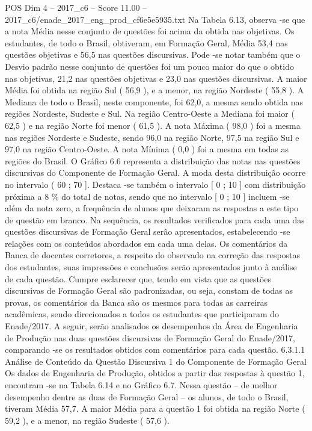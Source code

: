 \begin{textsample}{POS Dim 4 – 2017\_c6 – Score 11.00 – 2017\_c6/enade\_2017\_eng\_prod\_cf6e5e5935.txt}
Na Tabela 6.13, observa -se que a nota Média nesse conjunto de questões foi acima da obtida nas objetivas.
Os estudantes, de todo o Brasil, obtiveram, em Formação Geral, Média 53,4 nas questões objetivas e 56,5 nas questões discursivas.
Pode -se notar também que o Desvio padrão nesse conjunto de questões foi um pouco maior do que o obtido nas objetivas, 21,2 nas questões objetivas e 23,0 nas questões discursivas.
A maior Média foi obtida na região Sul ( 56,9 ), e a menor, na região Nordeste ( 55,8 ).
A Mediana de todo o Brasil, neste componente, foi 62,0, a mesma sendo obtida nas regiões Nordeste, Sudeste e Sul.
Na região Centro-Oeste a Mediana foi maior ( 62,5 ) e na região Norte foi menor ( 61,5 ).
A nota Máxima ( 98,0 ) foi a mesma nas regiões Nordeste e Sudeste, sendo 96,0 na região Norte, 97,5 na região Sul e 97,0 na região Centro-Oeste.
A nota Mínima ( 0,0 ) foi a mesma em todas as regiões do Brasil.
O Gráfico 6.6 representa a distribuição das notas nas questões discursivas do Componente de Formação Geral.
A moda desta distribuição ocorre no intervalo ( 60 ; 70 ].
Destaca -se também o intervalo [ 0 ; 10 ] com distribuição próxima a 8 \% do total de notas, sendo que no intervalo [ 0 ; 10 ] incluem -se além da nota zero, a frequência de alunos que deixaram as respostas a este tipo de questão em branco.
Na sequência, os resultados verificados para cada uma das questões discursivas de Formação Geral serão apresentados, estabelecendo -se relações com os conteúdos abordados em cada uma delas.
Os comentários da Banca de docentes corretores, a respeito do observado na correção das respostas dos estudantes, suas impressões e conclusões serão apresentados junto à análise de cada questão.
Cumpre esclarecer que, tendo em vista que as questões discursivas de Formação Geral são padronizadas, ou seja, constam de todas as provas, os comentários da Banca são os mesmos para todas as carreiras acadêmicas, sendo direcionados a todos os estudantes que participaram do Enade/2017.
A seguir, serão analisados os desempenhos da Área de Engenharia de Produção nas duas questões discursivas de Formação Geral do Enade/2017, comparando -se os resultados obtidos com comentários para cada questão. 6.3.1.1 Análise de Conteúdo da Questão Discursiva 1 do Componente de Formação Geral Os dados de Engenharia de Produção, obtidos a partir das respostas à questão 1, encontram -se na Tabela 6.14 e no Gráfico 6.7.
Nessa questão – de melhor desempenho dentre as duas de Formação Geral – os alunos, de todo o Brasil, tiveram Média 57,7.
A maior Média para a questão 1 foi obtida na região Norte ( 59,2 ), e a menor, na região Sudeste ( 57,6 ).

\end{textsample}
